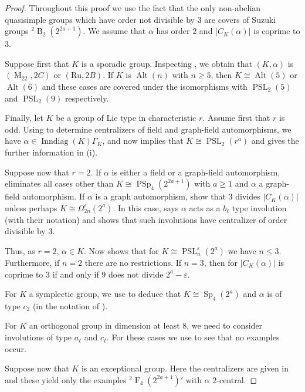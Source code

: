 \documentclass[12pt,a4paper]{amsart}
\DeclareMathOperator{\Inndiag}{Inndiag}
\DeclareMathOperator{\M}{M}
\DeclareMathOperator{\B}{B}
\DeclareMathOperator{\F}{F}
\DeclareMathOperator{\PSL}{PSL}
\DeclareMathOperator{\PSp}{PSp}
\DeclareMathOperator{\Sp}{Sp}
\DeclareMathOperator{\Alt}{Alt}
\renewcommand{\epsilon}{\varepsilon}
\newcommand{\eps}{\epsilon}
\begin{document}
 \begin{proof} Throughout this proof we use the fact that the only non-abelian quasisimple groups which have order not divisible by $3$ are covers of Suzuki groups ${}^2\B_2(2^{2a+1})$. We assume that $\alpha$ has order $2$ and $|C_K(\alpha)|$ is coprime to $3$.

  Suppose first that $K$ is a sporadic group. Inspecting \cite[Tables 5.3]{GLS3}, we obtain that $(K,\alpha)$ is  $(\M_{22}, 2C)$ or  $(\mathrm{Ru}, 2B)$.
  If $K$ is $\Alt(n)$ with $n\geq 5$, then  $K\cong \Alt(5)$ or $\Alt(6)$ and these cases are covered under the isomorphisms with $\PSL_2(5)$ and $\PSL_2(9)$ respectively.

Finally,  let  $K$ be a group of Lie type in characteristic $r$. Assume first that $r$ is odd.  Using \cite[Proposition 4.9.1]{GLS3} to determine centralizers of field and graph-field automorphisms, we have  $\alpha\in\Inndiag(K)\Gamma_K$, and now   \cite[Table 4.5.1]{GLS3} implies that $K\cong \PSL_2(r^a)$ and gives the further information in (i).

Suppose now that $r=2$. If $\alpha$ is either a field or a graph-field automorphism,    \cite[Proposition 4.9.1]{GLS3} eliminates all cases other than $K\cong \PSp_4(2^{2a+1})$ with $a\geq 1$ and $\alpha$ a graph-field automorphism. If $\alpha $ is a graph automorphism, \cite[(19.8) (i) and (19.9)]{AschbacherSeitz} show that $3$ divides $|C_K(\alpha)|$ unless perhaps
 $K\cong \Omega_{2n}^\eps(2^a)$. In this case, \cite[(7.6) and (8.10)]{AschbacherSeitz} says $\alpha$ acts as a $b_\ell$ type involution (with their notation) and \cite[(8.7)]{AschbacherSeitz} shows that such involutions have centralizer of order divisible by $3$.

 Thus, as $r=2$, $\alpha \in K$. Now  \cite[(4.3) and (6.2)]{AschbacherSeitz} shows that for $K\cong \PSL_n^\eps(2^a)$ we have $n \le 3$. Furthermore, if $n=2$ there are no restrictions.  If $n=3$, then for $|C_K(\alpha)|$ is coprime to $3$ if and only if $9$ does not divide $2^a-\epsilon$.

For $K$ a symplectic group, we use \cite[(7.6),(7.9),(7.10) and (7.11)]{AschbacherSeitz} to deduce that $K \cong \Sp_4(2^a)$ and $\alpha$ is of type $c_2$ (in the notation of \cite{AschbacherSeitz}).




For  $K$ an orthogonal group in dimension at least $8$, we need to consider involutions of type $a_\ell$ and $c_\ell$. For these cases we use \cite[(8.6) and (8.8)]{AschbacherSeitz} to see that no examples occur.


Suppose now that $K$ is an exceptional group. Here the centralizers are given in \cite[(13.3),(14.3),(15.6),
(16.20),(17.15),(18.4),(18.5),(18.6)]{AschbacherSeitz} and these yield only the examples   ${}^2\F_4(2^{2a+1})'$ with $\alpha$ $2$-central.\end{proof}
\end{document}
